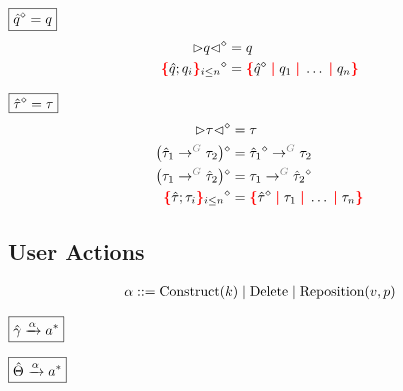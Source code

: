 \noindent $\boxed{\erase{\Z{q}} = q}$
%
\begin{align*}
  \erase{\cursor{q}} &= q \\
  \erase{\conflictHoleForm{\Z{q}; q_i}{i \leq n}} &= \conflictHole{\erase{\Z{q}}, q_1, \ldots, q_n}
\end{align*}

\noindent $\boxed{\erase{\Z{\tau}} = \tau}$
%
\begin{align*}
  \erase{\cursor{\tau}} &= \tau \\
  \erase{\left(\tArrow{G}{\Z{\tau}_1}{\tau_2}\right)} &= \tArrow{G}{\erase{\Z{\tau}_1}}{\tau_2} \\
  \erase{\left(\tArrow{G}{\tau_1}{\Z{\tau}_2}\right)} &= \tArrow{G}{\tau_1}{\erase{\Z{\tau}_2}} \\
  \erase{\conflictHoleForm{\Z{\tau}; \tau_i}{i \leq n}} &= \conflictHole{\erase{\Z{\tau}}, \tau_1, \ldots, \tau_n}
\end{align*}


\subsection{User Actions}


\[
  \arraycolsep=0pt
  \begin{array}{llll}
    \alpha & {}::={} &
      \Construct{k}
      \mid \Delete
      \mid \Reposition{v}{p}
    \\
  \end{array}
\]

\noindent $\boxed{\Z{\Grove} \action{\alpha} a^{*}}$
%
\begin{mathpar}


\end{mathpar}

\noindent $\boxed{\Z{\Set} \action{\alpha} a^{*}}$
%
\begin{mathpar}
\end{mathpar}

